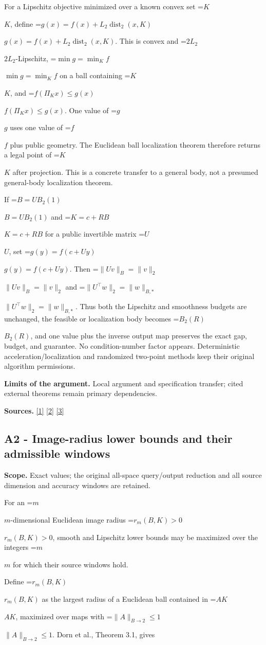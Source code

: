 \documentclass[10pt,a4paper]{article}
\newcommand{\AtlasMath}[1]{\par\begingroup\centering\setbox0=\hbox{$\displaystyle #1$}\ifdim\wd0>1.4\linewidth\typeout{ATLAS WIDE FORMULA: \the\wd0}\fi\ifdim\wd0>\linewidth\resizebox{\linewidth}{!}{\box0}\else\box0\fi\par\endgroup}
\newcommand{\AtlasInlineMath}[1]{\begingroup\setbox0=\hbox{$#1$}\ifdim\wd0>.4\linewidth\endgroup\AtlasMath{#1}\else\endgroup$#1$\fi}
\begin{document}
For a Lipschitz objective minimized over a known convex set \AtlasInlineMath{K}, define \AtlasInlineMath{g(x)=f(x)+L_2\operatorname{dist}_2(x,K)}. This is convex and \AtlasInlineMath{2L_2}-Lipschitz, \AtlasInlineMath{\min g=\min_K f} on a ball containing \AtlasInlineMath{K}, and \AtlasInlineMath{f(\Pi_Kx)\le g(x)}. One value of \AtlasInlineMath{g} uses one value of \AtlasInlineMath{f} plus public geometry. The Euclidean ball localization theorem therefore returns a legal point of \AtlasInlineMath{K} after projection. This is a concrete transfer to a general body, not a presumed general-body localization theorem.

If \AtlasInlineMath{B=UB_2(1)} and \AtlasInlineMath{K=c+RB} for a public invertible matrix \AtlasInlineMath{U}, set \AtlasInlineMath{g(y)=f(c+Uy)}. Then \AtlasInlineMath{\|Uv\|_B=\|v\|_2} and \AtlasInlineMath{\|U^\top w\|_2=\|w\|_{B,*}}. Thus both the Lipschitz and smoothness budgets are unchanged, the feasible or localization body becomes \AtlasInlineMath{B_2(R)}, and one value plus the inverse output map preserves the exact gap, budget, and guarantee. No condition-number factor appears. Deterministic acceleration/localization and randomized two-point methods keep their original algorithm permissions.

\textbf{Limits of the argument.} Local argument and specification transfer; cited external theorems remain primary dependencies.

\textbf{Sources.} \href{https://arxiv.org/html/2610.00345v1}{[1]} \href{https://arxiv.org/html/2607.16558v2}{[2]} \href{https://www.mathnet.ru/php/archive.phtml?jrnid=mzm&option_lang=eng&paperid=1697&wshow=paper}{[3]}

\subsection{A2 - Image-radius lower bounds and their admissible windows}
\textbf{Scope.} Exact values; the original all-space query/output reduction and all source dimension and accuracy windows are retained.

For an \AtlasInlineMath{m}-dimensional Euclidean image radius \AtlasInlineMath{r_m(B,K)>0}, smooth and Lipschitz lower bounds may be maximized over the integers \AtlasInlineMath{m} for which their source windows hold.

Define \AtlasInlineMath{r_m(B,K)} as the largest radius of a Euclidean ball contained in \AtlasInlineMath{AK}, maximized over maps with \AtlasInlineMath{\|A\|_{B\to2}\le1}. Dorn et al., Theorem 3.1, gives
\end{document}

